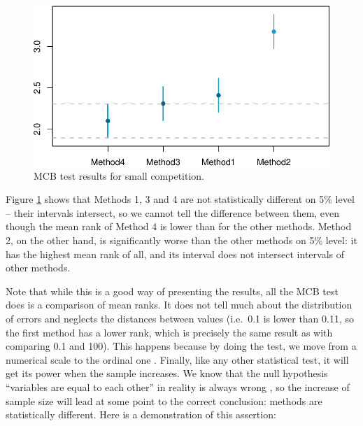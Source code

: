 \documentclass[]{book}
\theoremstyle{definition}
\theoremstyle{definition}
\theoremstyle{definition}
\theoremstyle{definition}
\theoremstyle{remark}
\begin{document}
\begin{figure}
\centering
\includegraphics{Svetunkov--2022----ADAM_files/figure-latex/mcbForCompetition-1.pdf}
\caption{\label{fig:mcbForCompetition}MCB test results for small competition.}
\end{figure}

Figure \ref{fig:mcbForCompetition} shows that Methods 1, 3 and 4 are not statistically different on 5\% level -- their intervals intersect, so we cannot tell the difference between them, even though the mean rank of Method 4 is lower than for the other methods. Method 2, on the other hand, is significantly worse than the other methods on 5\% level: it has the highest mean rank of all, and its interval does not intersect intervals of other methods.

Note that while this is a good way of presenting the results, all the MCB test does is a comparison of mean ranks. It does not tell much about the distribution of errors and neglects the distances between values (i.e.~0.1 is lower than 0.11, so the first method has a lower rank, which is precisely the same result as with comparing 0.1 and 100). This happens because by doing the test, we move from a numerical scale to the ordinal one \citep[see Section 1.2 of][]{SvetunkovSBA}. Finally, like any other statistical test, it will get its power when the sample increases. We know that the null hypothesis ``variables are equal to each other'' in reality is always wrong \citep[see Section 5.3 of][]{SvetunkovSBA}, so the increase of sample size will lead at some point to the correct conclusion: methods are statistically different. Here is a demonstration of this assertion:
\end{document}
